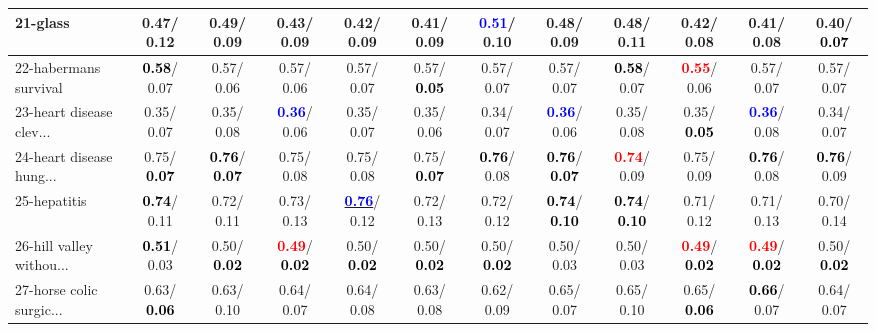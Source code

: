 \begin{table}[h]
\begin{center}
{\begin{tabular}{lc|c|c|c|c|c|c|c|c|c|c}
21-glass &   0.47/  0.12 &   0.49/  0.09 &   0.43/  0.09 &   0.42/  0.09 &   0.41/  0.09 & \textcolor{blue}{\textbf{  0.51}}/  0.10 &   0.48/  0.09 &   0.48/  0.11 &   0.42/  0.08 &   0.41/  0.08 &   0.40/\textcolor{black}{\textbf{  0.07}} \\ \hline
22-habermans survival & \textcolor{black}{\textbf{  0.58}}/  0.07 &   0.57/  0.06 &   0.57/  0.06 &   0.57/  0.07 &   0.57/\textcolor{black}{\textbf{  0.05}} &   0.57/  0.07 &   0.57/  0.07 & \textcolor{black}{\textbf{  0.58}}/  0.07 & \textcolor{red}{\textbf{  0.55}}/  0.06 &   0.57/  0.07 &   0.57/  0.07 \\
23-heart disease clev... &   0.35/  0.07 &   0.35/  0.08 & \textcolor{blue}{\textbf{  0.36}}/  0.06 &   0.35/  0.07 &   0.35/  0.06 &   0.34/  0.07 & \textcolor{blue}{\textbf{  0.36}}/  0.06 &   0.35/  0.08 &   0.35/\textcolor{black}{\textbf{  0.05}} & \textcolor{blue}{\textbf{  0.36}}/  0.08 &   0.34/  0.07 \\
24-heart disease hung... &   0.75/\textcolor{black}{\textbf{  0.07}} & \textcolor{black}{\textbf{  0.76}}/\textcolor{black}{\textbf{  0.07}} &   0.75/  0.08 &   0.75/  0.08 &   0.75/\textcolor{black}{\textbf{  0.07}} & \textcolor{black}{\textbf{  0.76}}/  0.08 & \textcolor{black}{\textbf{  0.76}}/\textcolor{black}{\textbf{  0.07}} & \textcolor{red}{\textbf{  0.74}}/  0.09 &   0.75/  0.09 & \textcolor{black}{\textbf{  0.76}}/  0.08 & \textcolor{black}{\textbf{  0.76}}/  0.09 \\
25-hepatitis & \textcolor{black}{\textbf{  0.74}}/  0.11 &   0.72/  0.11 &   0.73/  0.13 & \underline{\textcolor{blue}{\textbf{  0.76}}}/  0.12 &   0.72/  0.13 &   0.72/  0.12 & \textcolor{black}{\textbf{  0.74}}/\textcolor{black}{\textbf{  0.10}} & \textcolor{black}{\textbf{  0.74}}/\textcolor{black}{\textbf{  0.10}} &   0.71/  0.12 &   0.71/  0.13 &   0.70/  0.14 \\
26-hill valley withou... & \textcolor{black}{\textbf{  0.51}}/  0.03 &   0.50/\textcolor{black}{\textbf{  0.02}} & \textcolor{red}{\textbf{  0.49}}/\textcolor{black}{\textbf{  0.02}} &   0.50/\textcolor{black}{\textbf{  0.02}} &   0.50/\textcolor{black}{\textbf{  0.02}} &   0.50/\textcolor{black}{\textbf{  0.02}} &   0.50/  0.03 &   0.50/  0.03 & \textcolor{red}{\textbf{  0.49}}/\textcolor{black}{\textbf{  0.02}} & \textcolor{red}{\textbf{  0.49}}/\textcolor{black}{\textbf{  0.02}} &   0.50/\textcolor{black}{\textbf{  0.02}} \\
27-horse colic surgic... &   0.63/\textcolor{black}{\textbf{  0.06}} &   0.63/  0.10 &   0.64/  0.07 &   0.64/  0.08 &   0.63/  0.08 &   0.62/  0.09 &   0.65/  0.07 &   0.65/  0.10 &   0.65/\textcolor{black}{\textbf{  0.06}} & \textcolor{black}{\textbf{  0.66}}/  0.07 &   0.64/  0.07 \\

\end{tabular}}
\end{center}
\end{table}
